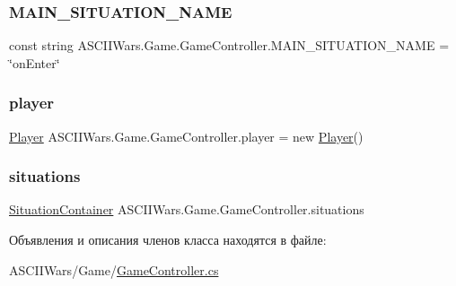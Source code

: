 \subsubsection{\texorpdfstring{M\+A\+I\+N\+\_\+\+S\+I\+T\+U\+A\+T\+I\+O\+N\+\_\+\+N\+A\+ME}{MAIN\_SITUATION\_NAME}}
{\footnotesize\ttfamily const string A\+S\+C\+I\+I\+Wars.\+Game.\+Game\+Controller.\+M\+A\+I\+N\+\_\+\+S\+I\+T\+U\+A\+T\+I\+O\+N\+\_\+\+N\+A\+ME = \char`\"{}on\+Enter\char`\"{}\hspace{0.3cm}{\ttfamily [private]}}

\hypertarget{class_a_s_c_i_i_wars_1_1_game_1_1_game_controller_a16a24596b98a17361e430d984f85a7ca}{}\label{class_a_s_c_i_i_wars_1_1_game_1_1_game_controller_a16a24596b98a17361e430d984f85a7ca} 
\subsubsection{\texorpdfstring{player}{player}}
{\footnotesize\ttfamily \hyperlink{class_a_s_c_i_i_wars_1_1_game_1_1_player}{Player} A\+S\+C\+I\+I\+Wars.\+Game.\+Game\+Controller.\+player = new \hyperlink{class_a_s_c_i_i_wars_1_1_game_1_1_player}{Player}()}

\hypertarget{class_a_s_c_i_i_wars_1_1_game_1_1_game_controller_aaab40310e11bd03711896ec5685ebe10}{}\label{class_a_s_c_i_i_wars_1_1_game_1_1_game_controller_aaab40310e11bd03711896ec5685ebe10} 
\subsubsection{\texorpdfstring{situations}{situations}}
{\footnotesize\ttfamily \hyperlink{class_a_s_c_i_i_wars_1_1_game_1_1_situation_container}{Situation\+Container} A\+S\+C\+I\+I\+Wars.\+Game.\+Game\+Controller.\+situations}



Объявления и описания членов класса находятся в файле\+:\begin{DoxyCompactItemize}
\item 
A\+S\+C\+I\+I\+Wars/\+Game/\hyperlink{_game_controller_8cs}{Game\+Controller.\+cs}\end{DoxyCompactItemize}
